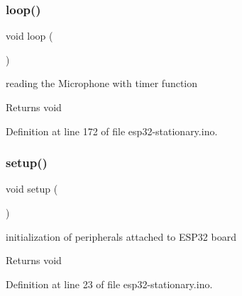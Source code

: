 \subsubsection{\texorpdfstring{loop()}{loop()}}
{\footnotesize\ttfamily void loop (\begin{DoxyParamCaption}{ }\end{DoxyParamCaption})}



reading the Microphone with timer function 

\begin{DoxyReturn}{Returns}
void 
\end{DoxyReturn}


Definition at line 172 of file esp32-\/stationary.\+ino.

\mbox{\label{esp32-stationary_8ino_a4fc01d736fe50cf5b977f755b675f11d}} 
\subsubsection{\texorpdfstring{setup()}{setup()}}
{\footnotesize\ttfamily void setup (\begin{DoxyParamCaption}{ }\end{DoxyParamCaption})}



initialization of peripherals attached to E\+S\+P32 board 

\begin{DoxyReturn}{Returns}
void 
\end{DoxyReturn}


Definition at line 23 of file esp32-\/stationary.\+ino.

